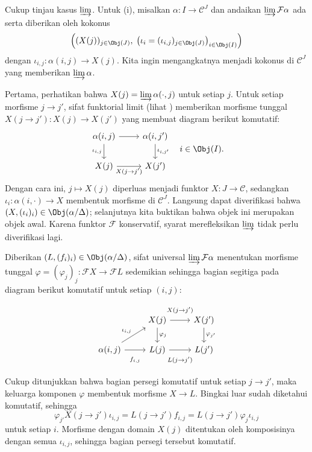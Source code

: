 \begin{bukti}
	Cukup tinjau kasus $\varinjlim$. Untuk (i), misalkan
	$\alpha: I \to \mathcal{C}^J$ dan andaikan $\varinjlim \mathcal{F}\alpha$
	ada serta diberikan oleh kokonus
	\[ \left( (X(j))_{j \in \Obj(J)}, \; \left( \iota_i = (\iota_{i, j})_{j \in \Obj(J)} \right)_{i \in \Obj(I)} \right) \]
	dengan $\iota_{i,j}: \alpha(i, j) \to X(j)$. Kita ingin mengangkatnya
	menjadi kokonus di $\mathcal{C}^J$ yang memberikan $\varinjlim \alpha$.

	Pertama, perhatikan bahwa
	$X(j) = \varinjlim \alpha(\cdot, j)$ untuk setiap $j$. Untuk setiap morfisme
	$j \to j'$, sifat funktorial limit (lihat
	\cite[Lema 2.7.4]{Li1}) memberikan morfisme tunggal
	$X(j \to j'): X(j) \to X(j')$ yang membuat diagram berikut komutatif:
	\[\begin{tikzcd}
		\alpha(i, j) \arrow[r] \arrow[d, "{\iota_{i, j}}"'] & \alpha(i, j') \arrow[d, "{\iota_{i, j'}}"] \\
		X(j) \arrow[r, "{X(j \to j')}"'] & X(j')
	\end{tikzcd} \quad i \in \Obj(I). \]
	Dengan cara ini, $j \mapsto X(j)$ diperluas menjadi funktor
	$X: J \to \mathcal{C}$, sedangkan
	$\iota_i: \alpha(i, \cdot) \to X$ membentuk morfisme di
	$\mathcal{C}^J$. Langsung dapat diverifikasi bahwa
	$(X, (\iota_i)_i) \in \Obj(\alpha/\Delta)$; selanjutnya kita buktikan
	bahwa objek ini merupakan objek awal. Karena funktor $\mathcal{F}$
	konservatif, syarat merefleksikan $\varinjlim$ tidak perlu diverifikasi lagi.

	Diberikan $(L, (f_i)_i) \in \Obj(\alpha/\Delta)$, sifat universal
	$\varinjlim \mathcal{F}\alpha$ menentukan morfisme tunggal
	$\varphi = (\varphi_j)_j : \mathcal{F}X \to \mathcal{F}L$ sedemikian sehingga
	bagian segitiga pada diagram berikut komutatif untuk setiap $(i, j)$:
	\[\begin{tikzcd}
		& X(j) \arrow[d, "\varphi_j"] \arrow[r, "{X(j \to j')}" inner sep=0.8em] & X(j') \arrow[d, "\varphi_{j'}"] \\
		\alpha(i, j) \arrow[ru, "{\iota_{i,j}}"] \arrow[r, "f_{i, j}"' inner sep=0.8em] & L(j) \arrow[r, "{L(j \to j')}"' inner sep=0.8em] & L(j')
	\end{tikzcd}\]
	Cukup ditunjukkan bahwa bagian persegi komutatif untuk setiap
	$j \to j'$, maka keluarga komponen $\varphi$ membentuk morfisme
	$X \to L$. Bingkai
	luar sudah diketahui komutatif, sehingga
	\[ \varphi_{j'} X(j \to j') \iota_{i, j} = L(j \to j') f_{i, j} = L(j \to j') \varphi_j \iota_{i, j} \]
	untuk setiap $i$. Morfisme dengan domain $X(j)$ ditentukan oleh
	komposisinya dengan semua $\iota_{i,j}$, sehingga bagian persegi tersebut
	komutatif.


\end{bukti}
